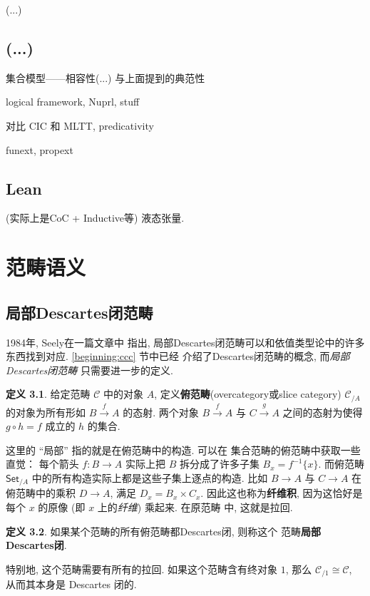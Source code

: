 \documentclass[UTF8]{ctexbook}
\theoremstyle{plain}
\theoremstyle{definition}
\newtheorem{definition}{定义}[chapter]
\theoremstyle{remark}
\begin{document}
(...)

\section{(...)}

集合模型------相容性(...) 与上面提到的典范性

logical framework, Nuprl, stuff

对比 CIC 和 MLTT, predicativity

funext, propext

\section{Lean} (实际上是CoC + Inductive等)
液态张量.\cite{scholze:2020:liquid}

\chapter{范畴语义}

\section{局部Descartes闭范畴}

1984年, Seely在一篇文章\cite{seely:1984:lccc}中
指出, 局部Descartes闭范畴可以和依值类型论中的许多
东西找到对应. \ref{beginning:ccc} 节中已经
介绍了Descartes闭范畴的概念, 而\emph{局部Descartes闭范畴}
只需要进一步的定义.
\begin{definition}
给定范畴 \(\mathcal C\) 中的对象 \(A\),
定义\textbf{俯范畴}(overcategory或slice category)
\(\mathcal C_{/A}\) 的对象为所有形如
\(B \xrightarrow{f} A\) 的态射. 两个对象
\(B \xrightarrow f A\) 与 \(C \xrightarrow g A\)
之间的态射为使得 \(g \circ h = f\) 成立的 \(h\) 的集合.
\end{definition}
这里的 “局部” 指的就是在俯范畴中的构造. 可以在
集合范畴的俯范畴中获取一些直觉： 每个箭头
\(f : B \to A\) 实际上把 \(B\) 拆分成了许多子集
\(B_x = f^{-1}\{x\}\). 而俯范畴 \(\textsf{Set}_{/A}\)
中的所有构造实际上都是这些子集上逐点的构造. 比如
\(B \to A\) 与 \(C \to A\) 在俯范畴中的乘积
\(D \to A\), 满足 \(D_x = B_x \times C_x\).
因此这也称为\textbf{纤维积}, 因为这恰好是每个 \(x\)
的原像 (即 \(x\) 上的\emph{纤维}) 乘起来. 在原范畴
中, 这就是拉回.
\begin{definition}
如果某个范畴的所有俯范畴都Descartes闭, 则称这个
范畴\textbf{局部Descartes闭}.
\end{definition}
特别地, 这个范畴需要有所有的拉回. 如果这个范畴含有终对象
\(1\), 那么 \(\mathcal C_{/1} \cong \mathcal C\),
从而其本身是 Descartes 闭的.
\end{document}
